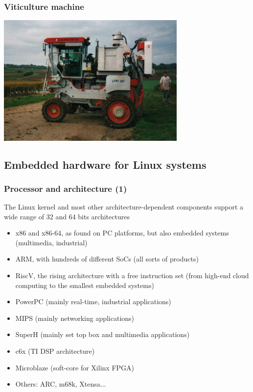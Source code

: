 \begin{frame}
\frametitle{Viticulture machine}
  \begin{center}
    \includegraphics[width=0.7\textwidth]{slides/sysdev-intro/viticulture-machine.jpg}
  \end{center}
\end{frame}

\subsection{Embedded hardware for Linux systems}

\begin{frame}
  \frametitle{Processor and architecture (1)}
  The Linux kernel and most other architecture-dependent
  components support a wide range of 32 and 64 bits architectures
  \begin{itemize}
  \item x86 and x86-64, as found on PC platforms, but also embedded systems
    (multimedia, industrial)
  \item ARM, with hundreds of different SoCs (all sorts of products)
  \item RiscV, the rising architecture with a free instruction set
        (from high-end cloud computing to the smallest embedded systems)
  \item PowerPC (mainly real-time, industrial applications)
  \item MIPS (mainly networking applications)
  \item SuperH (mainly set top box and multimedia applications)
  \item c6x (TI DSP architecture)
  \item Microblaze (soft-core for Xilinx FPGA)
  \item Others: ARC, m68k, Xtensa...
  \end{itemize}
\end{frame}

